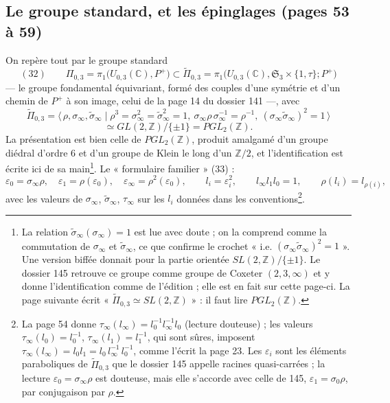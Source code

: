 \documentclass[11pt,a4paper]{article}
\begin{document}
\subsection*{Le groupe standard, et les épinglages (pages 53 à 59)}

On repère tout par le groupe standard
\[
(32)\qquad \Pi_{0,3} = \pi_1\bigl(U_{0,3}(\mathbb{C}), P^{+}\bigr) \subset
\widetilde\Pi_{0,3} = \pi_1\bigl(U_{0,3}(\mathbb{C}), \mathfrak{S}_3 \times \{1, \tau\}; P^{+}\bigr)
\]
— le groupe fondamental équivariant, formé des couples d'une symétrie et d'un
chemin de $P^{+}$ à son image, celui de la page 14 du dossier 141 —, avec
\[
\widetilde\Pi_{0,3} = \langle\, \rho, \sigma_\infty, \tilde\sigma_\infty \mid \rho^3 = \sigma_\infty^2 = \tilde\sigma_\infty^2 = 1,\ \sigma_\infty\rho\,\sigma_\infty^{-1} = \rho^{-1},\ (\sigma_\infty\tilde\sigma_\infty)^2 = 1 \,\rangle
\]
\[
\simeq GL(2, \mathbb{Z})/\{\pm 1\} = PGL_2(\mathbb{Z}) .
\]
La présentation est bien celle de $PGL_2(\mathbb{Z})$, produit amalgamé d'un
groupe diédral d'ordre $6$ et d'un groupe de Klein le long d'un
$\mathbb{Z}/2$, et l'identification est écrite ici de sa main\footnote{La
relation $\tilde\sigma_\infty(\sigma_\infty) = 1$ est lue avec doute ; on la
comprend comme la commutation de $\sigma_\infty$ et $\tilde\sigma_\infty$, ce
que confirme le crochet « i.e. $(\sigma_\infty\tilde\sigma_\infty)^2 = 1$ ».
Une version biffée donnait pour la partie orientée
$SL(2,\mathbb{Z})/\{\pm 1\}$. Le dossier 145 retrouve ce groupe comme groupe de
Coxeter $(2, 3, \infty)$ et y donne l'identification comme de l'édition ; elle
est en fait sur cette page-ci. La page suivante écrit
« $\widetilde\Pi_{0,3} \simeq SL(2,\mathbb{Z})$ » : il faut lire
$PGL_2(\mathbb{Z})$.}. Le « formulaire familier » (33) :
\[
\varepsilon_0 = \sigma_\infty\rho, \quad \varepsilon_1 = \rho(\varepsilon_0), \quad \varepsilon_\infty = \rho^2(\varepsilon_0), \qquad
l_i = \varepsilon_i^2, \qquad l_\infty l_1 l_0 = 1, \qquad \rho(l_i) = l_{\rho(i)},
\]
avec les valeurs de $\sigma_\infty$, $\tilde\sigma_\infty$, $\tau_\infty$ sur les
$l_i$ données dans les conventions\footnote{La page 54 donne
$\tau_\infty(l_\infty) = l_0^{-1}l_\infty^{-1}l_0$ (lecture douteuse) ; les
valeurs $\tau_\infty(l_0) = l_0^{-1}$, $\tau_\infty(l_1) = l_1^{-1}$, qui sont
sûres, imposent $\tau_\infty(l_\infty) = l_0 l_1 = l_0\, l_\infty^{-1}\,
l_0^{-1}$, comme l'écrit la page 23. Les $\varepsilon_i$ sont les éléments
paraboliques de $\widetilde\Pi_{0,3}$ que le dossier 145 appelle racines
quasi-carrées ; la lecture $\varepsilon_0 = \sigma_\infty\rho$ est douteuse,
mais elle s'accorde avec celle de 145, $\varepsilon_1 = \sigma_0\rho$, par
conjugaison par $\rho$.}.
\end{document}
